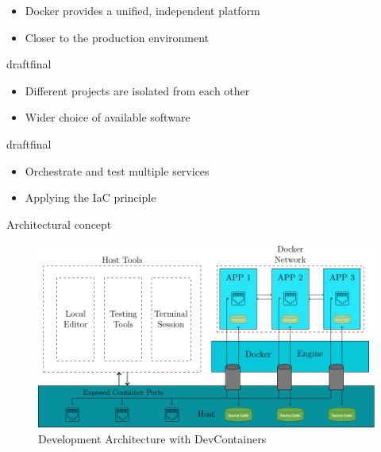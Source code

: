 \documentclass{beamer}
\def\final{final}
\def\status{draft}
\begin{document}
\begin{frame}{}
  \begin{block}{}
    \begin{itemize}
      \item Docker provides a unified, independent platform
      \item Closer to the production environment
    \end{itemize}
  \end{block}

  \ifx\status\final{}
    \pause{}
  \fi


  \begin{block}{}
    \begin{itemize}
      \item Different projects are isolated from each other
      \item Wider choice of available software
    \end{itemize}
  \end{block}


  \ifx\status\final{}
    \pause{}
  \fi


  \begin{block}{}
    \begin{itemize}
      \item Orchestrate and test multiple services
      \item Applying the IaC principle
    \end{itemize}
  \end{block}
\end{frame}


\begin{frame}{}
  \vspace{-0.2cm}
  \begin{center}
    \large Architectural concept
  \end{center}
  \vspace{-0.4cm}
  \begin{figure}
    \includegraphics[width=\textwidth]{img/thesis_main-figure2.pdf}
    \caption{Development Architecture with DevContainers}
  \end{figure}
\end{frame}
\end{document}
